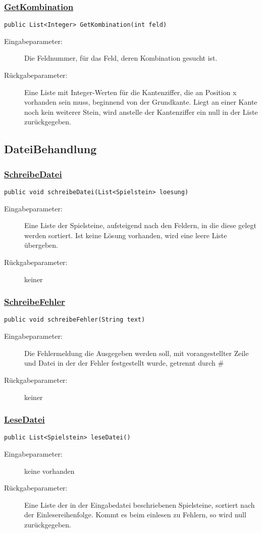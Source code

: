 \subsubsection{\underline{GetKombination}}
\lstinline{public List<Integer> GetKombination(int feld)}
\begin{description}
	\item [Eingabeparameter:] Die Feldnummer, für das Feld, deren Kombination gesucht ist.
	\item [Rückgabeparameter:] Eine Liste mit Integer-Werten für die Kantenziffer, die an Position x vorhanden sein muss, beginnend von der Grundkante. Liegt an einer Kante noch kein weiterer Stein, wird anstelle der Kantenziffer ein null in der Liste zurückgegeben.
\end{description}

\subsection{DateiBehandlung}
\subsubsection{\underline{SchreibeDatei}}
\lstinline{public void schreibeDatei(List<Spielstein> loesung)}
\begin{description}
	\item [Eingabeparameter:] Eine Liste der Spielsteine, aufsteigend nach den Feldern, in die diese gelegt werden sortiert. Ist keine Lösung vorhanden, wird eine leere Liste übergeben.
	\item [Rückgabeparameter:] keiner
\end{description}

\subsubsection{\underline{SchreibeFehler}}
\lstinline{public void schreibeFehler(String text)}
\begin{description}
	\item [Eingabeparameter:] Die Fehlermeldung die Ausgegeben werden soll, mit vorangestellter Zeile und Datei in der der Fehler festgestellt wurde, getrennt durch \#
	\item [Rückgabeparameter:] keiner
\end{description}

\subsubsection{\underline{LeseDatei}}
\lstinline{public List<Spielstein> leseDatei()}
\begin{description}
    \item [Eingabeparameter:] keine vorhanden
    \item [Rückgabeparameter:] Eine Liste der in der Eingabedatei beschriebenen Spielsteine, sortiert nach der Einlesereihenfolge. Kommt es beim einlesen zu Fehlern, so wird null zurückgegeben.
\end{description}

